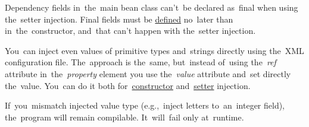 \warning Dependency fields in~the~main bean class can't~be declared as~final when using the~setter injection.
Final fields must be \hyperref[declarationdefinition]{defined} no~later than in~the~constructor, and~that can't happen with the~setter injection.

\enlargethispage{20mm}
\thispagestyle{empty}
\label{injectingliteralvalues}
You~can inject even values of primitive types and~strings directly using the~XML configuration file.
The~approach is the~same, but~instead of~using the~\textit{ref} attribute in~the~\textit{property} element you use the~\textit{value} attribute and~set directly the~value.
You~can do it both for~\hyperref[constructorinjection]{constructor} and~\hyperref[setterinjection]{setter} injection.

\warning If~you~mismatch injected value type (e.g.,~inject letters to~an~integer field), the~program will remain compilable.
It~will~fail only at~runtime.
\newpage

